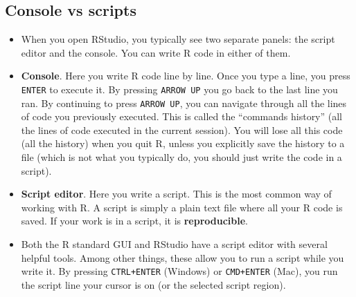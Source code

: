 \documentclass[
]{book}
\providecommand{\tightlist}{%
  \setlength{\itemsep}{0pt}\setlength{\parskip}{0pt}}
\begin{document}
\hypertarget{console-vs-scripts}{%
\subsection{Console vs scripts}\label{console-vs-scripts}}

\begin{itemize}
\tightlist
\item
  When you open RStudio, you typically see two separate panels: the script editor and the console. You can write R code in either of them.
\item
  \textbf{Console}. Here you write R code line by line. Once you type a line, you press \texttt{ENTER} to execute it. By pressing \texttt{ARROW\ UP} you go back to the last line you ran. By continuing to press \texttt{ARROW\ UP}, you can navigate through all the lines of code you previously executed. This is called the ``commands history'' (all the lines of code executed in the current session). You will lose all this code (all the history) when you quit R, unless you explicitly save the history to a file (which is not what you typically do, you should just write the code in a script).\\
\item
  \textbf{Script editor}. Here you write a script. This is the most common way of working with R. A script is simply a plain text file where all your R code is saved. If your work is in a script, it is \textbf{reproducible}.
\item
  Both the R standard GUI and RStudio have a script editor with several helpful tools. Among other things, these allow you to run a script while you write it. By pressing \texttt{CTRL+ENTER} (Windows) or \texttt{CMD+ENTER} (Mac), you run the script line your cursor is on (or the selected script region).


\end{itemize}
\end{document}
